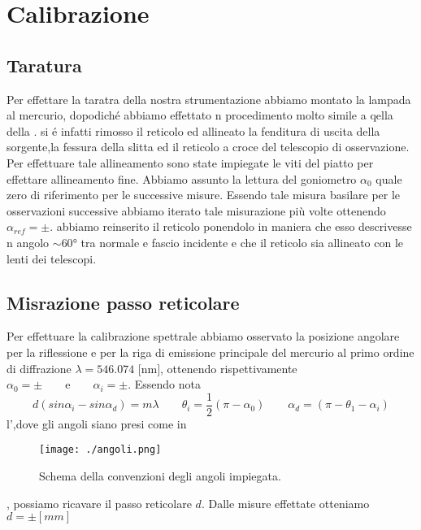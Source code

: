 \section{Calibrazione}
\subsection{Taratura}
	Per effettare la taratra della nostra strumentazione
	abbiamo montato la lampada al mercurio,
	dopodiché abbiamo effettato n procedimento molto
	simile a qella della .
	si é infatti
	rimosso il reticolo ed allineato la
	fenditura di uscita della sorgente,la fessura della slitta
	ed il reticolo a croce del telescopio di osservazione.
	Per effettuare tale allineamento sono state impiegate 
	le viti del piatto per effettare allineamento fine.
	Abbiamo assunto la lettura del goniometro
	$\alpha_0$ quale zero di riferimento per le successive misure.
	Essendo tale misura basilare per le osservazioni successive
	abbiamo iterato tale misurazione più volte
	ottenendo $\alpha_{ref}=	\pm		$.
	abbiamo reinserito il reticolo ponendolo in 
	maniera che esso descrivesse n angolo $\sim \ang{60}$
	tra normale e fascio incidente e che il reticolo sia allineato 
	con le lenti dei telescopi.
\subsection{Misrazione passo reticolare}
	Per effettuare la calibrazione spettrale abbiamo 
	osservato la posizione angolare per la riflessione 
	e per la riga di emissione principale del mercurio al 
	primo ordine di diffrazione $\lambda =546.074\text{ [nm]}$,
	ottenendo rispettivamente $\alpha_0=	\pm		\qquad\text{e}\qquad	\alpha_i=	\pm		$.
	Essendo nota
	\smallskip
	\begin{equation}\label{eq:passo_reticolo}
	d(sin \alpha_i - sin \alpha_d) = m \lambda\qquad \theta_i=\frac{1}{2}(\pi- \alpha_0)\qquad \alpha_d=(\pi- \theta_1-\alpha_i)
	\end{equation}
	l',dove gli angoli siano presi come in 
	\bigskip
	\begin{figure} [!h]
		\centering
		\texttt{[image: ./angoli.png]}
		\caption{Schema della convenzioni degli angoli impiegata.}
		\label{fig:angoli}
	\end{figure}
	\smallskip
	,
	possiamo ricavare il passo reticolare $d$.
	Dalle misure effettate otteniamo $d=	\pm 	[mm]$

